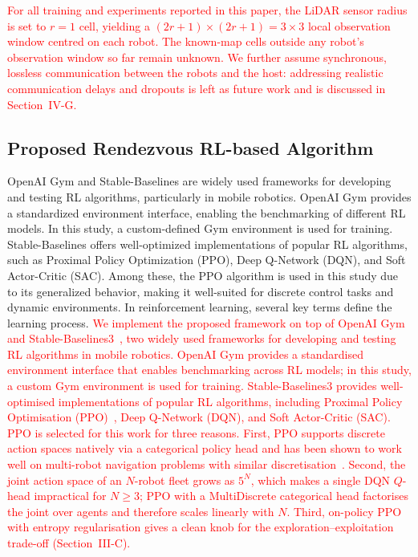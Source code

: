 \documentclass[journal]{IEEEtran}
\begin{document}
\textcolor{red}{For all training and experiments reported in this paper, the LiDAR sensor radius is set to $r = 1$ cell, yielding a $(2r{+}1) \times (2r{+}1) = 3 \times 3$ local observation window centred on each robot. The known-map cells outside any robot's observation window so far remain unknown. We further assume synchronous, lossless communication between the robots and the host: addressing realistic communication delays and dropouts is left as future work and is discussed in Section~IV-G.}

\subsection{Proposed Rendezvous RL-based Algorithm}

\textcolor{green!60!black}{OpenAI Gym and Stable-Baselines are widely used frameworks for developing and testing RL algorithms, particularly in mobile robotics. OpenAI Gym provides a standardized environment interface, enabling the benchmarking of different RL models. In this study, a custom-defined Gym environment is used for training. Stable-Baselines offers well-optimized implementations of popular RL algorithms, such as Proximal Policy Optimization (PPO), Deep Q-Network (DQN), and Soft Actor-Critic (SAC). Among these, the PPO algorithm is used in this study due to its generalized behavior, making it well-suited for discrete control tasks and dynamic environments. In reinforcement learning, several key terms define the learning process.}
\textcolor{red}{We implement the proposed framework on top of OpenAI Gym~\cite{brockman2016openai} and Stable-Baselines3~\cite{raffin2021stable}, two widely used frameworks for developing and testing RL algorithms in mobile robotics. OpenAI Gym provides a standardised environment interface that enables benchmarking across RL models; in this study, a custom Gym environment is used for training. Stable-Baselines3 provides well-optimised implementations of popular RL algorithms, including Proximal Policy Optimisation (PPO)~\cite{schulman2017proximal}, Deep Q-Network (DQN), and Soft Actor-Critic (SAC). PPO is selected for this work for three reasons. First, PPO supports discrete action spaces natively via a categorical policy head and has been shown to work well on multi-robot navigation problems with similar discretisation~\cite{10611573}. Second, the joint action space of an $N$-robot fleet grows as $5^{N}$, which makes a single DQN $Q$-head impractical for $N \geq 3$; PPO with a MultiDiscrete categorical head factorises the joint over agents and therefore scales linearly with $N$. Third, on-policy PPO with entropy regularisation gives a clean knob for the exploration--exploitation trade-off (Section~III-C).}
\end{document}
